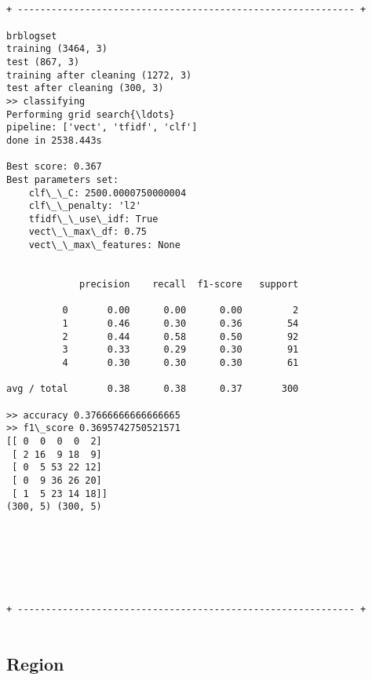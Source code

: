 \documentclass[11pt]{article}
\begin{document}
    \begin{Verbatim}[commandchars=\\\{\}]


+ ------------------------------------------------------------ +

brblogset
training (3464, 3)
test (867, 3)
training after cleaning (1272, 3)
test after cleaning (300, 3)
>> classifying
Performing grid search{\ldots}
pipeline: ['vect', 'tfidf', 'clf']
done in 2538.443s

Best score: 0.367
Best parameters set:
	clf\_\_C: 2500.0000750000004
	clf\_\_penalty: 'l2'
	tfidf\_\_use\_idf: True
	vect\_\_max\_df: 0.75
	vect\_\_max\_features: None


             precision    recall  f1-score   support

          0       0.00      0.00      0.00         2
          1       0.46      0.30      0.36        54
          2       0.44      0.58      0.50        92
          3       0.33      0.29      0.30        91
          4       0.30      0.30      0.30        61

avg / total       0.38      0.38      0.37       300

>> accuracy 0.37666666666666665
>> f1\_score 0.3695742750521571
[[ 0  0  0  0  2]
 [ 2 16  9 18  9]
 [ 0  5 53 22 12]
 [ 0  9 36 26 20]
 [ 1  5 23 14 18]]
(300, 5) (300, 5)

    \end{Verbatim}

    \begin{center}
    \end{center}
    { \hspace*{\fill} \\}
    
    \begin{center}
    \end{center}
    { \hspace*{\fill} \\}
    
    \begin{Verbatim}[commandchars=\\\{\}]


+ ------------------------------------------------------------ +


    \end{Verbatim}

    \subsection{Region}\label{region}
\end{document}
